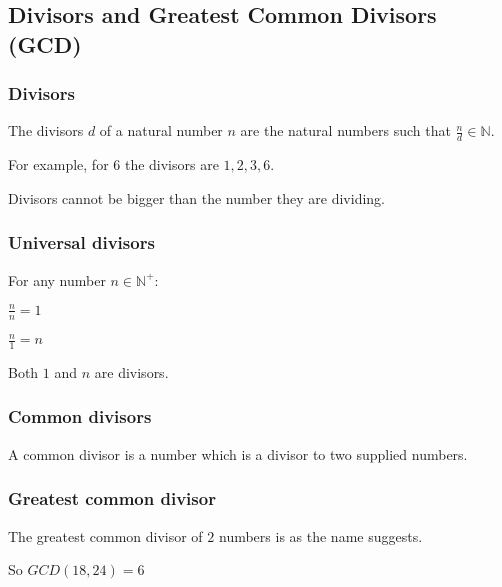 
\subsection{Divisors and Greatest Common Divisors (GCD)}

\subsubsection{Divisors}

The divisors \(d\) of a natural number \(n\) are the natural numbers such that \(\frac{n}{d}\in \mathbb{N}\).

For example, for \(6\) the divisors are \(1, 2, 3, 6\).

Divisors cannot be bigger than the number they are dividing.

\subsubsection{Universal divisors}

For any number \(n \in \mathbb{N}^+\):

\(\frac{n}{n}=1\)

\(\frac{n}{1}=n\)

Both \(1\) and \(n\) are divisors.

\subsubsection{Common divisors}

A common divisor is a number which is a divisor to two supplied numbers.

\subsubsection{Greatest common divisor}

The greatest common divisor of \(2\) numbers is as the name suggests.

So \(GCD(18,24)=6\)

